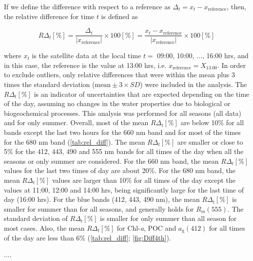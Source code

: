 \documentclass[remotesensing,article,submit,moreauthors,pdftex,10pt,a4paper]{Definitions/mdpi}
\begin{document}
If we define the difference with respect to a reference as $\Delta_t=x_t-x_\text{reference}$, then, the relative difference for time $t$ is defined as
\begin{linenomath*}
\begin{equation}
	R\Delta_t[\%] = \frac{\Delta_t}{|x_\text{reference}|} \times 100[\%] = \frac{x_t-x_\text{reference}}{|x_\text{reference}|}
	\times 100[\%]
\end{equation}
\end{linenomath*}
where $x_t$ is the satellite data at the local time $t =$ 09:00, 10:00, $\dots$, 16:00 hrs, and in this case, the reference is the value at 13:00 hrs, i.e. $x_\text{reference} = X_\text{13:00}$. In order to exclude outliers, only relative differences that were within the mean plus 3 times the standard deviation ($\text{mean}\pm3\times SD$) were included in the analysis. The $R\Delta_t[\%]$ is an indicator of uncertainties that are expected depending on the time of the day, assuming no changes in the water properties due to biological or biogeochemical processes. This analysis was performed for all seasons (all data) and for only summer. Overall, most of the mean $R\Delta_t[\%]$ are below 10\% for all bands except the last two hours for the 660 nm band and for most of the times for the 680 nm band (\autoref{tab:rel_diff}). The mean $R\Delta_t[\%]$ are smaller or close to 5\% for the 412, 443, 490 and 555 nm bands for all times of the day when all the seasons or only summer are considered. For the 660 nm band, the mean $R\Delta_t[\%]$ values for the last two times of day are about 20\%. For the 680 nm band, the mean $R\Delta_t[\%]$ values are larger than 10\% for all times of the day except the values at 11:00, 12:00 and 14:00 hrs, being significantly large for the last time of day (16:00 hrs). For the blue bands (412, 443, 490 nm), the mean $R\Delta_t[\%]$ is smaller for summer than for all seasons, and generally holds for $R_\text{rs}(555)$. The standard deviation of $R\Delta_t[\%]$ is smaller for only summer than all season for most cases. Also, the mean $R\Delta_t[\%]$ for Chl-{\it a}, POC and $a_\text{g}(412)$ for all times of the day are less than 6\%  (\autoref{tab:rel_diff}; \autoref{fig:Diff4th}). 

\cite{OMalley2014}....

\end{document}
